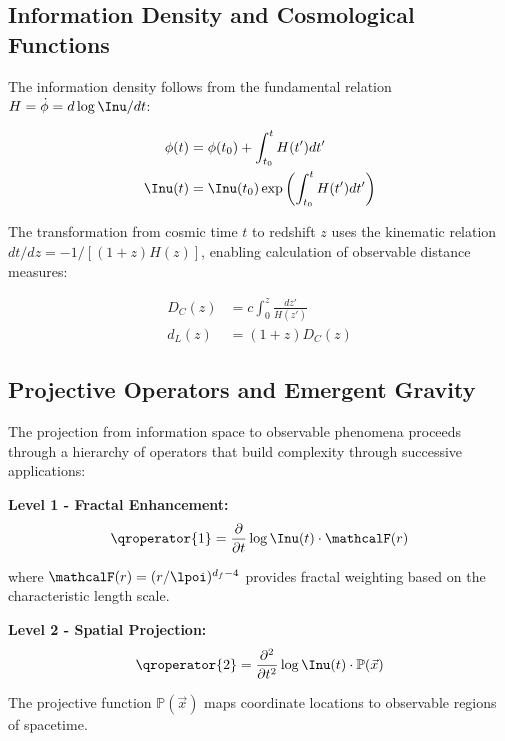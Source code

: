 \subsection{Information Density and Cosmological Functions}
\label{subsec:cosmological-functions}

The information density follows from the fundamental relation $H = \dot{\phi} = d\log\Inu/dt$:

\begin{align}
\phi(t) &= \phi(t_0) + \int_{t_0}^t H(t') dt' \\
\Inu(t) &= \Inu(t_0) \exp\left(\int_{t_0}^t H(t') dt'\right)
\label{eq:info-density-evolution}
\end{align}

The transformation from cosmic time $t$ to redshift $z$ uses the kinematic relation $dt/dz = -1/[(1+z)H(z)]$, enabling calculation of observable distance measures:

\begin{align}
D_C(z) &= c \int_0^z \frac{dz'}{H(z')} \\
d_L(z) &= (1+z) D_C(z)
\label{eq:distance-measures}
\end{align}

\subsection{Projective Operators and Emergent Gravity}
\label{subsec:projective-operators}

The projection from information space to observable phenomena proceeds through a hierarchy of operators that build complexity through successive applications:

\textbf{Level 1 - Fractal Enhancement:}
\begin{equation}
\qroperator{1} = \frac{\partial}{\partial t} \log \Inu(t) \cdot \mathcalF(r)
\label{eq:level1-operator}
\end{equation}

where $\mathcalF(r) = (r/\lpoi)^{d_f-4}$ provides fractal weighting based on the characteristic length scale.

\textbf{Level 2 - Spatial Projection:}
\begin{equation}
\qroperator{2} = \frac{\partial^2}{\partial t^2} \log \Inu(t) \cdot \mathbb{P}(\vec{x})
\label{eq:level2-operator}
\end{equation}

The projective function $\mathbb{P}(\vec{x})$ maps coordinate locations to observable regions of spacetime.

